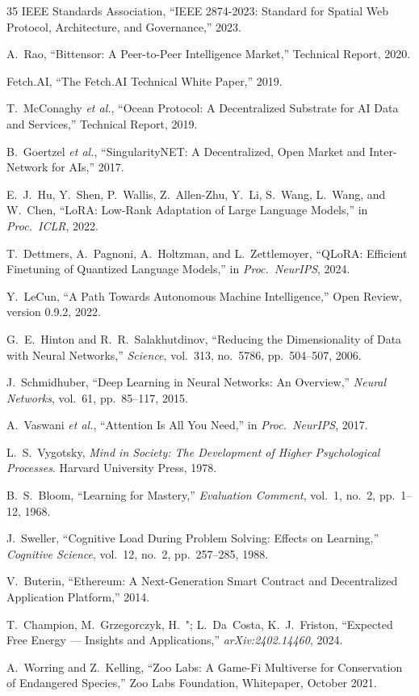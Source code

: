 \documentclass[11pt,letterpaper]{article}
\begin{document}
\begin{thebibliography}{35}
IEEE Standards Association, ``IEEE 2874-2023: Standard for Spatial Web Protocol, Architecture, and Governance,'' 2023.

A.~Rao, ``Bittensor: A Peer-to-Peer Intelligence Market,'' Technical Report, 2020.

Fetch.AI, ``The Fetch.AI Technical White Paper,'' 2019.

T.~McConaghy \emph{et al.}, ``Ocean Protocol: A Decentralized Substrate for AI Data and Services,'' Technical Report, 2019.

B.~Goertzel \emph{et al.}, ``SingularityNET: A Decentralized, Open Market and Inter-Network for AIs,'' 2017.

E.~J.~Hu, Y.~Shen, P.~Wallis, Z.~Allen-Zhu, Y.~Li, S.~Wang, L.~Wang, and W.~Chen, ``LoRA: Low-Rank Adaptation of Large Language Models,'' in \emph{Proc.\ ICLR}, 2022.

T.~Dettmers, A.~Pagnoni, A.~Holtzman, and L.~Zettlemoyer, ``QLoRA: Efficient Finetuning of Quantized Language Models,'' in \emph{Proc.\ NeurIPS}, 2024.

Y.~LeCun, ``A Path Towards Autonomous Machine Intelligence,'' Open Review, version 0.9.2, 2022.

G.~E.~Hinton and R.~R.~Salakhutdinov, ``Reducing the Dimensionality of Data with Neural Networks,'' \emph{Science}, vol.~313, no.~5786, pp.~504--507, 2006.

J.~Schmidhuber, ``Deep Learning in Neural Networks: An Overview,'' \emph{Neural Networks}, vol.~61, pp.~85--117, 2015.

A.~Vaswani \emph{et al.}, ``Attention Is All You Need,'' in \emph{Proc.\ NeurIPS}, 2017.

L.~S.~Vygotsky, \emph{Mind in Society: The Development of Higher Psychological Processes}. Harvard University Press, 1978.

B.~S.~Bloom, ``Learning for Mastery,'' \emph{Evaluation Comment}, vol.~1, no.~2, pp.~1--12, 1968.

J.~Sweller, ``Cognitive Load During Problem Solving: Effects on Learning,'' \emph{Cognitive Science}, vol.~12, no.~2, pp.~257--285, 1988.

V.~Buterin, ``Ethereum: A Next-Generation Smart Contract and Decentralized Application Platform,'' 2014.

T.~Champion, M.~Grzegorczyk, H.~"; L.~Da~Costa, K.~J.~Friston, ``Expected Free Energy --- Insights and Applications,'' \emph{arXiv:2402.14460}, 2024.

A.~Worring and Z.~Kelling, ``Zoo Labs: A Game-Fi Multiverse for Conservation of Endangered Species,'' Zoo Labs Foundation, Whitepaper, October 2021.

\end{thebibliography}
\end{document}
